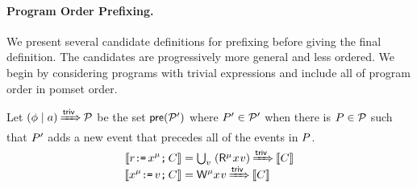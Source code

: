


\paragraph{Program Order Prefixing.} %
We present several candidate definitions for prefixing before giving the
final definition.  The candidates are progressively more general and less
ordered.  We begin by considering programs with trivial expressions and
include all of program order in pomset order.


\begin{candidate}
  \label{def:rw:sc1}
  Let $(\phi \mid a) \mathbin{{\xRightarrow{{\mathsf{triv}}}}} \mathcal{P}$ be the set $\mathsf{pre}(\mathcal{P}')$ where
  $P'\in\mathcal{P}'$ when there is $P\in\mathcal{P}$ such that $P'$ adds a
  new event %
  that precedes all of the events in $P$.
  \begin{align*}
    \sem{\aReg\GETS\aLoc^\amode\SEMI \aCmd} & =
    \smash{\textstyle\bigcup_\aVal\; (\DRmode\aLoc\aVal) \prefixsimp \sem{\aCmd}}
    \\
    \sem{\aLoc^\amode\GETS\aVal\SEMI \aCmd} & =
    \smash{\DWmode\aLoc\aVal \prefixsimp \sem{\aCmd}}
  \end{align*}
\end{candidate}


